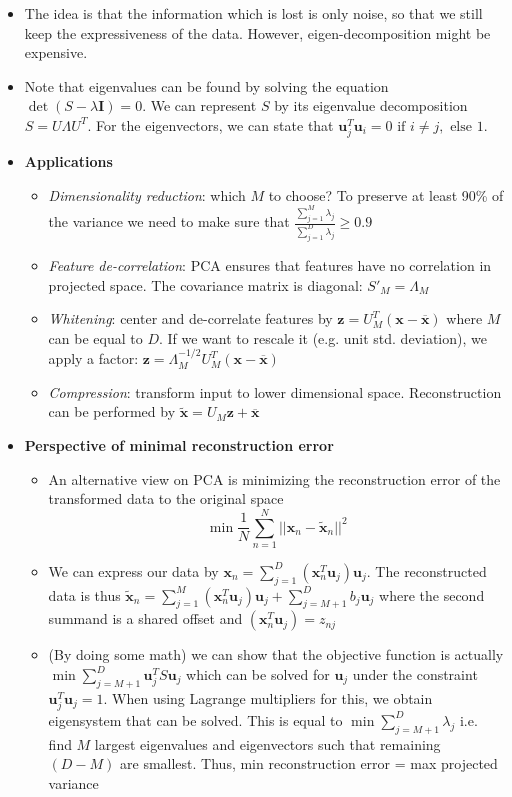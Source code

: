\begin{itemize}
	\item The idea is that the information which is lost is only noise, so that we still keep the expressiveness of the data. However, eigen-decomposition might be expensive.
	\item Note that eigenvalues can be found by solving the equation $\det\left(S - \lambda \bm{I}\right) = 0$. We can represent $S$ by its eigenvalue decomposition $S=U\Lambda U^T$. For the eigenvectors, we can state that $\bm{u}_j^T \bm{u}_i = 0 \text{ if } i\neq j, \text{ else } 1$.
	\item \textbf{Applications}
	\begin{itemize}
		\item \textit{Dimensionality reduction}: which $M$ to choose? To preserve at least 90\% of the variance we need to make sure that $\frac{\sum_{j=1}^{M}\lambda_j}{\sum_{j=1}^{D}\lambda_j} \geq 0.9$
		\item \textit{Feature de-correlation}: PCA ensures that features have no correlation in projected space. The covariance matrix is diagonal: $S'_M = \Lambda_M$
		\item \textit{Whitening}: center and de-correlate features by $\bm{z} = U_M^T (\bm{x}-\overline{\bm{x}})$ where $M$ can be equal to $D$. If we want to rescale it (e.g. unit std. deviation), we apply a factor: $\bm{z} = \Lambda_M^{-1/2} U_M^T (\bm{x}-\overline{\bm{x}})$ 
		\item \textit{Compression}: transform input to lower dimensional space. Reconstruction can be performed by $\tilde{\bm{x}} = U_M \bm{z} + \overline{\bm{x}}$
	\end{itemize}
	\item \textbf{Perspective of minimal reconstruction error}
	\begin{itemize}
		\item An alternative view on PCA is minimizing the reconstruction error of the transformed data to the original space
		$$\min \frac{1}{N} \sum\limits_{n=1}^{N} ||\bm{x}_n - \bm{\tilde{x}}_n||^2$$
		\item We can express our data by $\bm{x}_n = \sum\limits_{j=1}^{D} (\bm{x}_n^T \bm{u}_j) \bm{u}_j$. The reconstructed data is thus $\bm{\tilde{x}}_n = \sum\limits_{j=1}^{M} (\bm{x}_n^T \bm{u}_j) \bm{u}_j + \sum\limits_{j=M+1}^{D} b_j \bm{u}_j$ where the second summand is a shared offset and $(\bm{x}_n^T \bm{u}_j) = z_{nj}$
		\item (By doing some math) we can show that the objective function is actually $\min \sum_{j=M+1}^{D} \bm{u}_j^T S \bm{u}_j$ which can be solved for $\bm{u}_j$ under the constraint $\bm{u}_j^T \bm{u}_j = 1$. When using Lagrange multipliers for this, we obtain eigensystem that can be solved. This is equal to $\min \sum_{j=M+1}^{D} \lambda_j$ i.e. find $M$ largest eigenvalues and eigenvectors such that remaining $(D-M)$ are smallest. Thus, min reconstruction error = max projected variance
	\end{itemize}
\end{itemize}
